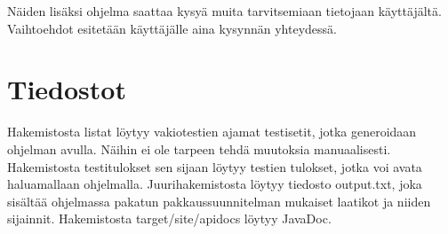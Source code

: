 \documentclass[a4paper,12pt, titlepage]{article}
\begin{document}
\noindent
Näiden lisäksi ohjelma saattaa kysyä muita tarvitsemiaan tietojaan käyttäjältä. Vaihtoehdot esitetään käyttäjälle aina kysynnän yhteydessä.

\section*{Tiedostot}
Hakemistosta listat löytyy vakiotestien ajamat testisetit, jotka generoidaan ohjelman avulla. Näihin ei ole tarpeen tehdä muutoksia manuaalisesti. Hakemistosta testitulokset sen sijaan löytyy testien tulokset, jotka voi avata haluamallaan ohjelmalla. Juurihakemistosta löytyy tiedosto output.txt, joka sisältää ohjelmassa pakatun pakkaussuunnitelman mukaiset laatikot ja niiden sijainnit. Hakemistosta target/site/apidocs löytyy JavaDoc.
\end{document}
